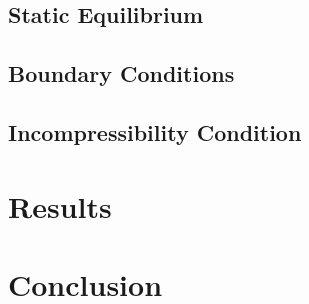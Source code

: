 \documentclass[12pt]{report}
\begin{document}
\subsection{Static Equilibrium}

\subsection{Boundary Conditions}

\subsection{Incompressibility Condition}

\section{Results}

\section{Conclusion}



	\nocite{tensor}
    
	
\end{document}
